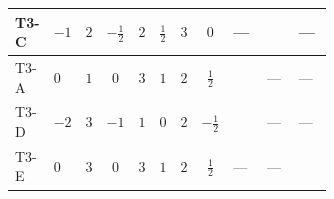 \documentclass[8pt]{article}
\begin{document}
\begin{landscape}
\begin{longtable}{@{}llcccccc >{\raggedright\arraybackslash}p{0.21\linewidth} >{\raggedright\arraybackslash}p{0.21\linewidth} >{\raggedright\arraybackslash}p{0.21\linewidth}@{}}
\midrule
T3-C & $-1$ & $2$ & $-\frac{1}{2}$ & $2$ & $\frac{1}{2}$ & $3$ & $0$ & --- & \scriptsize\adjustbox{max width=\linewidth}{$\begin{gathered} \frac{i lambdaT_{3} \overline{y_{1}} \overline{y_{2}}}{3 MF}\end{gathered}$} & --- \\
\midrule
T3-A & $0$ & $1$ & $0$ & $3$ & $1$ & $2$ & $\frac{1}{2}$ & \scriptsize\adjustbox{max width=\linewidth}{$\begin{gathered} - \frac{\sqrt{3} i lambdaT_{3} \overline{y_{1}} \overline{y_{2}}}{3 MF}\end{gathered}$} & --- & --- \\
\midrule
T3-D & $-2$ & $3$ & $-1$ & $1$ & $0$ & $2$ & $-\frac{1}{2}$ & \scriptsize\adjustbox{max width=\linewidth}{$\begin{gathered} - \frac{\sqrt{3} i lambdaT_{3} \overline{y_{1}} \overline{y_{2}}}{3 MF}\end{gathered}$} & --- & --- \\
\midrule
T3-E & $0$ & $3$ & $0$ & $3$ & $1$ & $2$ & $\frac{1}{2}$ & --- & --- & \scriptsize\adjustbox{max width=\linewidth}{$\begin{gathered} \frac{\sqrt{6} i lambdaT_{3} \overline{y_{1}} \overline{y_{2}}}{3 MF}\end{gathered}$} \\
\midrule
\bottomrule
\end{longtable}
\clearpage

\end{landscape}
\end{document}
